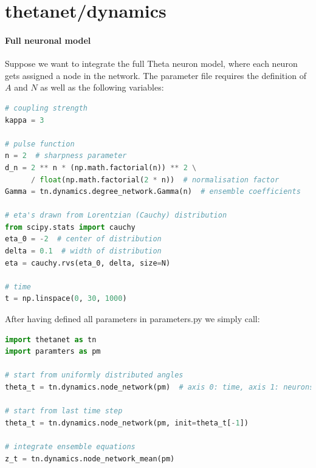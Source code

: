 \documentclass[bibliography=totoc, twoside]{article}
\numberwithin{equation}{section}
\begin{document}
\section{thetanet/dynamics}
\paragraph*{Full neuronal model}
Suppose we want to integrate the full Theta neuron model, where each neuron gets assigned a node in the network.
The parameter file requires the definition of $A$ and $N$ as well as the following variables:
\begin{lstlisting}[language=python]
# coupling strength
kappa = 3

# pulse function
n = 2  # sharpness parameter
d_n = 2 ** n * (np.math.factorial(n)) ** 2 \
      / float(np.math.factorial(2 * n))  # normalisation factor
Gamma = tn.dynamics.degree_network.Gamma(n)  # ensemble coefficients

# eta's drawn from Lorentzian (Cauchy) distribution
from scipy.stats import cauchy
eta_0 = -2  # center of distribution
delta = 0.1  # width of distribution
eta = cauchy.rvs(eta_0, delta, size=N)

# time
t = np.linspace(0, 30, 1000)
\end{lstlisting}
After having defined all parameters in parameters.py we simply call:
\begin{lstlisting}[language=python]
import thetanet as tn
import paramters as pm

# start from uniformly distributed angles
theta_t = tn.dynamics.node_network(pm)  # axis 0: time, axis 1: neurons

# start from last time step
theta_t = tn.dynamics.node_network(pm, init=theta_t[-1])

# integrate ensemble equations
z_t = tn.dynamics.node_network_mean(pm)
\end{lstlisting}
\end{document}
